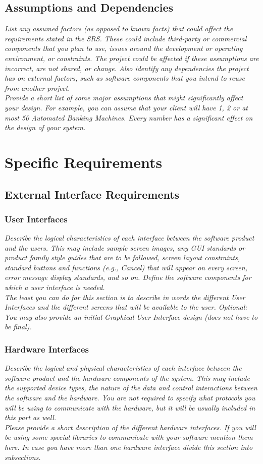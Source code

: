 \documentclass[12pt]{article}
\newcommand{\gnl}{\vspace{1em}\\}      %
\begin{document}
    \subsection{Assumptions and Dependencies}
        \emph{List any assumed factors (as opposed to known facts) that could affect the requirements stated in the SRS. These could include third-party or commercial components that you plan to use, issues around the development or operating environment, or constraints. The project could be affected if these assumptions are incorrect, are not shared, or change. Also identify any dependencies the project has on external factors, such as software components that you intend to reuse from another project.\gnl Provide a short list of some major assumptions that might significantly affect your design. For example, you can assume that your client will have 1, 2 or at most 50 Automated Banking Machines. Every number has a significant effect on the design of your system.}
\pagebreak

\section{Specific Requirements}
    \subsection{External Interface Requirements}
        \subsubsection{User Interfaces}
            \emph{Describe the logical characteristics of each interface between the software product and the users. This may include sample screen images, any GUI standards or product family style guides that are to be followed, screen layout constraints, standard buttons and functions (e.g., Cancel) that will appear on every screen, error message display standards, and so on. Define the software components for which a user interface is needed.\gnl The least you can do for this section is to describe in words the different User Interfaces and the different screens that will be available to the user. Optional: You may also provide an initial Graphical User Interface design (does not have to be final).}
        \subsubsection{Hardware Interfaces}
            \emph{Describe the logical and physical characteristics of each interface between the software product and the hardware components of the system. This may include the supported device types, the nature of the data and control interactions between the software and the hardware. You are not required to specify what protocols you will be using to communicate with the hardware, but it will be usually included in this part as well.\gnl Please provide a short description of the different hardware interfaces. If you will be using some special libraries to communicate with your software mention them here. In case you have more than one hardware interface divide this section into subsections.}
\end{document}
